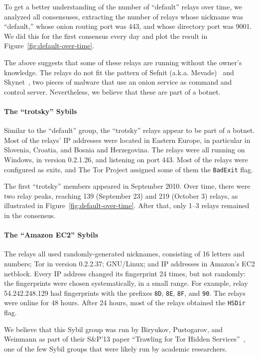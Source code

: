 To get a better understanding of the number of ``default'' relays over time, we
analyzed all consensuses, extracting the number of relays whose nickname was
``default,'' whose onion routing port was 443, and whose directory port was
9001.  We did this for the first consensus every day and plot the result in
Figure~\ref{fig:default-over-time}.

The above suggests that some of these relays are running without the owner's
knowledge.  The relays do not fit the pattern of Sefnit (a.k.a.
Mevade)~\cite{sefnit} and Skynet~\cite{skynet}, two pieces of malware that use
an onion service as command and control server.  Nevertheless, we believe that
these are part of a botnet.

\paragraph{The ``trotsky'' Sybils}
Similar to the ``default'' group, the ``trotsky'' relays appear to be part of
a botnet.  Most of the relays' IP addresses were located in Eastern Europe, in
particular in Slovenia, Croatia, and Bosnia and Herzegovina.  The relays were
all running on Windows, in version 0.2.1.26, and listening on port 443.  Most of
the relays were configured as exits, and The Tor Project assigned some of them
the \texttt{BadExit} flag.

The first ``trotsky'' members appeared in September 2010.  Over time, there were
two relay peaks, reaching 139 (September 23) and 219 (October 3) relays, as
illustrated in Figure~\ref{fig:default-over-time}.  After that, only 1--3 relays
remained in the consensus.

\paragraph{The ``Amazon EC2'' Sybils}
The relays all used randomly-generated nicknames, consisting of 16 letters and
numbers; Tor in version 0.2.2.37; GNU/Linux; and IP addresses in Amazon's EC2
netblock.  Every IP address changed its fingerprint 24 times, but not randomly:
the fingerprints were chosen systematically, in a small range.  For example,
relay 54.242.248.129 had fingerprints with the prefixes \texttt{8D},
\texttt{8E}, \texttt{8F}, and \texttt{90}.  The relays were online for 48 hours.
After 24 hours, most of the relays obtained the \texttt{HSDir} flag.

We believe that this Sybil group was run by Biryukov, Pustogarov, and Weinmann
as part of their S\&P'13 paper ``Trawling for Tor Hidden
Services''~\cite{Biryukov2013a}, one of the few Sybil groups that were likely
run by academic researchers.

